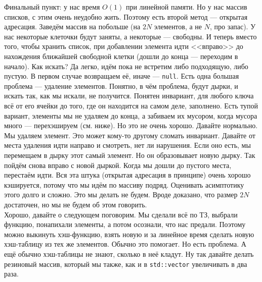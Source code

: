 \documentclass{article}
\newcommand{\pseudo}{PseudoLexer.py:PseudoLexer -x}
\newcommand{\pseudocode}[1]{\texttt{#1}}
\begin{document}
    Финальный пункт: у нас время $O(1)$ при линейной памяти. Но у нас массив списков, с этим очень неудобно жить. Поэтому есть второй метод --- открытая адресация. Заведём массив на побольше (на $2N$ элементов, а не $N$, про запас). У нас некоторые клеточки будут заняты, а некоторые --- свободны. И теперь вместо того, чтобы хранить список, при добавлении элемента идти <<вправо>> до нахождения ближайшей свободной клетки (дошли до конца --- переходим в начало). Как искать? Да легко, идём пока не встретим либо подходящую, либо пустую. В первом случае возвращаем её, иначе --- \pseudocode{null}. Есть одна большая проблема --- удаление элементов. Понятно, в чём проблема, будут дырки, и искать так, как мы искали, не получится. Понятен инвариант, для любого ключа всё от его ячейки до того, где он находится на самом деле, заполнено. Есть тупой вариант, элементы мы не удаляем до конца, а забиваем их мусором, когда мусора много --- перехэшируем (см. ниже). Но это не очень хорошо. Давайте нормально. Мы удаляем элемент. Это может кому-то другому сломать инвариант. Давайте от места удаления идти направо и смотреть, нет ли нарушения. Если оно есть, мы перемещаем в дырку этот самый элемент. Но он образовывает новую дырку. Так пойдём снова вправо с новой дыркой. Когда мы дошли до пустого места, перестаём идти. Вся эта штука (открытая адресация в принципе) очень хорошо кэшируется, потому что мы идём по массиву подряд. Оценивать асимптотику этого долго и сложно. Это мы делать не будем. Вроде доказано, что размер $2N$ достаточен, но мы не будем об этом говорить.\\
    Хорошо, давайте о следующем поговорим. Мы сделали всё по ТЗ, выбрали функцию, понапихали элементы, а потом осознали, что нас предали. Поэтому можно выкинуть хэш-функцию, взять новую и за линейное время сделать новую хэш-таблицу из тех же элементов. Обычно это помогает. Но есть проблема. А ещё обычно хэш-таблицы не знают, сколько в неё кладут. Ну так давайте делать резиновый массив, который мы также, как и в \texttt{std::vector} увеличивать в два раза.
\end{document}
